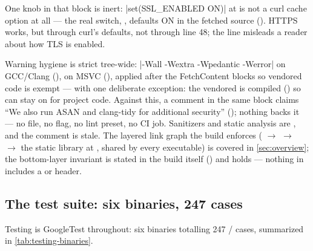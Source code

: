 One knob in that block is inert: \cppinline|set(SSL_ENABLED ON)| at 
is not a curl cache option at all --- the real switch, , defaults ON
in the fetched source (). HTTPS works, but
through curl's defaults, not through line 48; the line misleads a reader about how TLS is
enabled.

Warning hygiene is strict tree-wide: \cppinline|-Wall -Wextra -Wpedantic -Werror| on
GCC/Clang (),  on MSVC (),
applied after the FetchContent blocks so vendored code is exempt --- with one deliberate
exception: the vendored  is compiled 
() so  can stay on for project code. Against this, a
comment in the same block claims ``We also run ASAN and clang-tidy for additional security''
(); nothing backs it --- no  file, no
 flag, no lint preset, no CI job. Sanitizers and static analysis are
\fabsent, and the comment is stale. The layered link graph the build enforces
( $\rightarrow$  $\rightarrow$  $\rightarrow$ the
 static library at , shared by every
executable) is covered in \cref{sec:overview}; the bottom-layer invariant is stated in the
build itself () and holds --- nothing in  includes
a  or  header.

\subsection{The test suite: six binaries, 247 cases}\label{sec:testing-suite}

Testing is GoogleTest throughout: six binaries totalling 247 /
cases, summarized in \cref{tab:testing-binaries}.

